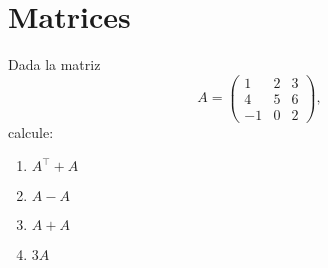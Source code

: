 \documentclass[a4,11pt]{aleph-notas}
\begin{document}
\encabezado

\vspace*{-10mm}
\tableofcontents

\section{Matrices}

\begin{ejer}
    Dada la matriz 
    \[
        A = \begin{pmatrix} 
            1 & 2 & 3 \\ 
            4 & 5 & 6 \\ 
            -1 & 0 & 2
            \end{pmatrix},
    \]
    calcule:
\begin{enumerate}
    \item $A^\intercal + A$
    \item $A - A$
    \item $A + A$
    \item $3A$
\end{enumerate}
\end{ejer}
\end{document}
